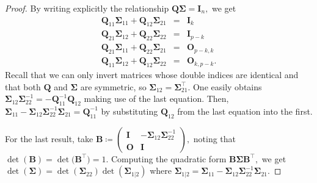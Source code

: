 \documentclass[
  11pt,
  letterpaper,
]{scrbook}
\theoremstyle{definition}
\theoremstyle{plain}
\theoremstyle{plain}
\theoremstyle{plain}
\theoremstyle{definition}
\theoremstyle{definition}
\theoremstyle{plain}
\theoremstyle{plain}
\theoremstyle{remark}
\begin{document}
\begin{proof}
By writing explicitly the relationship \(\mathbf{Q}
\boldsymbol{\Sigma}=\mathbf{I}_n,\) we get \begin{eqnarray*}
\mathbf{Q}_{11}\boldsymbol{\Sigma}_{11}+\mathbf{Q}_{12}\boldsymbol{\Sigma}_{21}&=&\mathbf{I}_{k}\\
\mathbf{Q}_{21}\boldsymbol{\Sigma}_{12}+\mathbf{Q}_{22}\boldsymbol{\Sigma}_{22}&=&\mathbf{I}_{p-k}\\
\mathbf{Q}_{21}\boldsymbol{\Sigma}_{11}+\mathbf{Q}_{22}\boldsymbol{\Sigma}_{21}&=&\mathbf{O}_{p-k, k}\\
\mathbf{Q}_{11}\boldsymbol{\Sigma}_{12}+\mathbf{Q}_{12}\boldsymbol{\Sigma}_{22}&=&\mathbf{O}_{k, p-k}.
\end{eqnarray*} Recall that we can only invert matrices whose double
indices are identical and that both \(\mathbf{Q}\) and
\(\boldsymbol{\Sigma}\) are symmetric, so
\(\boldsymbol{\Sigma}_{12} = \boldsymbol{\Sigma}_{21}^\top.\) One easily
obtains
\(\boldsymbol{\Sigma}_{12} \boldsymbol{\Sigma}_{22}^{-1}=-\mathbf{Q}_{11}^{-1}\mathbf{Q}_{12}\)
making use of the last equation. Then,
\(\boldsymbol{\Sigma}_{11}-\boldsymbol{\Sigma}_{12}\boldsymbol{\Sigma}_{22}^{-1}\boldsymbol{\Sigma}_{21}=\mathbf{Q}_{11}^{-1}\)
by substituting \(\mathbf{Q}_{12}\) from the last equation into the
first.

For the last result, take
\(\boldsymbol{B}\coloneqq \left(\begin{smallmatrix}
\mathbf{I} & -\boldsymbol{\Sigma}_{12}\boldsymbol{\Sigma}^{-1}_{22}
\\ \mathbf{O} & \mathbf{I} \end{smallmatrix}\right),\) noting that
\(\det (\boldsymbol{B})=\det\big( \boldsymbol{B}^\top\big)=1
.\) Computing the quadratic form
\(\boldsymbol{B}\boldsymbol{\Sigma}\boldsymbol{B}^\top,\) we get
\(\det(\boldsymbol{\Sigma})=\det(\boldsymbol{\Sigma}_{22})\det(\boldsymbol{\Sigma}_{1|2})\)
where
\(\boldsymbol{\Sigma}_{1|2}=\boldsymbol{\Sigma}_{11}-\boldsymbol{\Sigma}_{12}\boldsymbol{\Sigma}_{22}^{-1}\boldsymbol{\Sigma}_{21}.\)
\end{proof}
\end{document}
